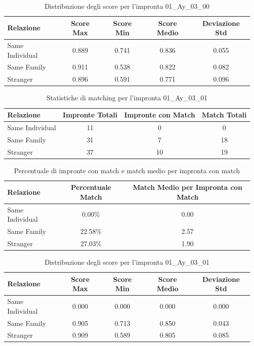 \begin{table}[htbp]
\centering
\caption{Distribuzione degli score per l'impronta 01\_Ay\_03\_00}
\label{tab:scores_01_Ay_03_00}
\begin{tabular}{|l|c|c|c|c|}
\hline
\textbf{Relazione} & \textbf{Score Max} & \textbf{Score Min} & \textbf{Score Medio} & \textbf{Deviazione Std} \\
\hline
Same Individual & 0.889 & 0.741 & 0.836 & 0.055 \\
\hline
Same Family & 0.911 & 0.538 & 0.822 & 0.082 \\
\hline
Stranger & 0.896 & 0.591 & 0.771 & 0.096 \\
\hline
\end{tabular}
\end{table}


\begin{table}[htbp]
\centering
\caption{Statistiche di matching per l'impronta 01\_Ay\_03\_01}
\label{tab:results_01_Ay_03_01}
\begin{tabular}{|l|c|c|c|}
\hline
\textbf{Relazione} & \textbf{Impronte Totali} & \textbf{Impronte con Match} & \textbf{Match Totali} \\
\hline
Same Individual & 11 & 0 & 0 \\
\hline
Same Family & 31 & 7 & 18 \\
\hline
Stranger & 37 & 10 & 19 \\
\hline
\end{tabular}
\end{table}


\begin{table}[htbp]
\centering
\caption{Percentuale di impronte con match e match medio per impronta con match}
\label{tab:match_percentage_01_Ay_03_01}
\begin{tabular}{|l|c|c|}
\hline
\textbf{Relazione} & \textbf{Percentuale Match} & \textbf{Match Medio per Impronta con Match} \\
\hline
Same Individual & 0.00\% & 0.00 \\
\hline
Same Family & 22.58\% & 2.57 \\
\hline
Stranger & 27.03\% & 1.90 \\
\hline
\end{tabular}
\end{table}


\begin{table}[htbp]
\centering
\caption{Distribuzione degli score per l'impronta 01\_Ay\_03\_01}
\label{tab:scores_01_Ay_03_01}
\begin{tabular}{|l|c|c|c|c|}
\hline
\textbf{Relazione} & \textbf{Score Max} & \textbf{Score Min} & \textbf{Score Medio} & \textbf{Deviazione Std} \\
\hline
Same Individual & 0.000 & 0.000 & 0.000 & 0.000 \\
\hline
Same Family & 0.905 & 0.713 & 0.850 & 0.043 \\
\hline
Stranger & 0.909 & 0.589 & 0.805 & 0.085 \\
\hline
\end{tabular}
\end{table}


